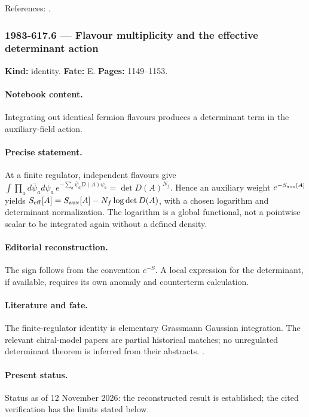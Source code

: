 \noindent References: \citep{polyakovwiegmann1983goldstone}.\par

\subsubsection{1983-617.6 --- Flavour multiplicity and the effective determinant action}

\label{item:1983-617.6}

\noindent\textbf{Kind:} identity. \textbf{Fate:} E. \textbf{Pages:} 1149--1153.\par

\paragraph{Notebook content.} Integrating out identical fermion flavours produces a determinant term in the auxiliary-field action.

\paragraph{Precise statement.} At a finite regulator, independent flavours give $\int\prod_a d\bar\psi_a d\psi_a\,e^{-\sum_a\bar\psi_aD(A)\psi_a}=\det D(A)^{N_f}$. Hence an auxiliary weight $e^{-S_{\rm aux}[A]}$ yields $S_{\rm eff}[A]=S_{\rm aux}[A]-N_f\log\det D(A)$, with a chosen logarithm and determinant normalization. The logarithm is a global functional, not a pointwise scalar to be integrated again without a defined density.

\paragraph{Editorial reconstruction.} The sign follows from the convention $e^{-S}$. A local expression for the determinant, if available, requires its own anomaly and counterterm calculation.

\paragraph{Literature and fate.} The finite-regulator identity is elementary Grassmann Gaussian integration. The relevant chiral-model papers are partial historical matches; no unregulated determinant theorem is inferred from their abstracts. \citep{polyakovwiegmann1983goldstone,polyakovwiegmann1984multivalued}.

\paragraph{Present status.} Status as of 12 November 2026: the reconstructed result is established; the cited verification has the limits stated below.

